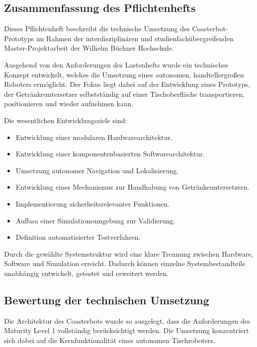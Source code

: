 \documentclass[
  a4paper,
  12pt,
  DIV=12,        %
  parskip=half,  %
  headings=small %
]{scrartcl}
\theoremstyle{definition}
\providecommand{\tightlist}{%
  \setlength{\itemsep}{0pt}\setlength{\parskip}{0pt}}
\theoremstyle{definition}
\begin{document}
\subsection{Zusammenfassung des
Pflichtenhefts}\label{zusammenfassung-des-pflichtenhefts}

Dieses Pflichtenheft beschreibt die technische Umsetzung des
Coasterbot-Prototyps im Rahmen der interdisziplinären und
studienfachübergreifenden Master-Projektarbeit der Wilhelm Büchner
Hochschule.

Ausgehend von den Anforderungen des Lastenhefts wurde ein technisches
Konzept entwickelt, welches die Umsetzung eines autonomen,
handtellergroßen Roboters ermöglicht. Der Fokus liegt dabei auf der
Entwicklung eines Prototyps, der Getränkeuntersetzer selbstständig auf
einer Tischoberfläche transportieren, positionieren und wieder aufnehmen
kann.

Die wesentlichen Entwicklungsziele sind:

\begin{itemize}
\tightlist
\item
  Entwicklung einer modularen Hardwarearchitektur.
\item
  Entwicklung einer komponentenbasierten Softwarearchitektur.
\item
  Umsetzung autonomer Navigation und Lokalisierung.
\item
  Entwicklung eines Mechanismus zur Handhabung von Getränkeuntersetzern.
\item
  Implementierung sicherheitsrelevanter Funktionen.
\item
  Aufbau einer Simulationsumgebung zur Validierung.
\item
  Definition automatisierter Testverfahren.
\end{itemize}

Durch die gewählte Systemstruktur wird eine klare Trennung zwischen
Hardware, Software und Simulation erreicht. Dadurch können einzelne
Systembestandteile unabhängig entwickelt, getestet und erweitert werden.

\subsection{Bewertung der technischen
Umsetzung}\label{bewertung-der-technischen-umsetzung}

Die Architektur des Coasterbots wurde so ausgelegt, dass die
Anforderungen des Maturity Level 1 vollständig berücksichtigt werden.
Die Umsetzung konzentriert sich dabei auf die Kernfunktionalität eines
autonomen Tischroboters.
\end{document}
